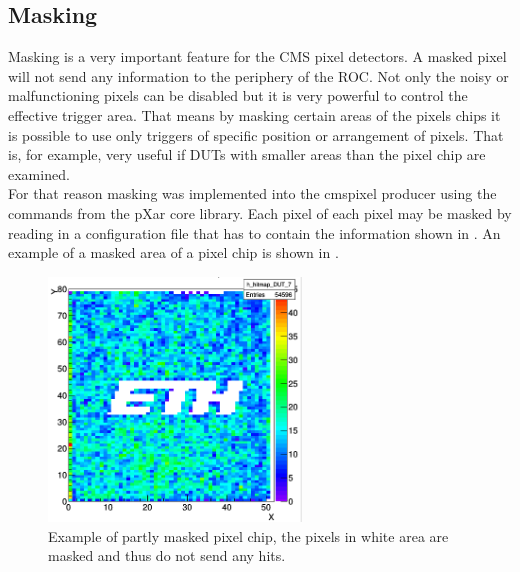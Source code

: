 \documentclass[british,11pt,a4paper]{memoir}
\begin{document}
\subsection{Masking}\label{smasking}
Masking is a very important feature for the CMS pixel detectors. A masked pixel will not send any information to the periphery of the \ac{ROC}. Not only the noisy or malfunctioning pixels can be disabled but it is very powerful to control the effective trigger area. That means by masking certain areas of the pixels chips it is possible to use only triggers of specific position or arrangement of pixels. That is, for example, very useful if \ac{DUT}s with smaller areas than the pixel chip are examined.\\
For that reason masking was implemented into the cmspixel producer using the commands from the pXar core library. Each pixel of each pixel may be masked by reading in a configuration file that has to contain the information shown in . An example of a masked area of a pixel chip is shown in .
\begin{figure}[ht]
	\centering
	\includegraphics[width=0.6\textwidth]{mask}
	\caption{Example of partly masked pixel chip, the pixels in white area are masked and thus do not send any hits.}
	\label{pmask}
\end{figure}\no
\end{document}
